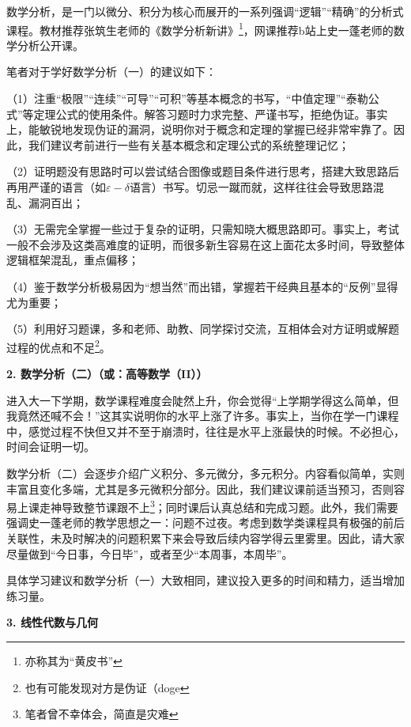 \documentclass[11pt,oneside]{book}
\begin{document}
数学分析，是一门以微分、积分为核心而展开的一系列强调“逻辑”“精确”的分析式课程。教材推荐张筑生老师的《数学分析新讲》\footnote{亦称其为“黄皮书”}，网课推荐b站上史一蓬老师的数学分析公开课。

\vspace{10pt}

笔者对于学好数学分析（一）的建议如下：

（1）注重“极限”“连续”“可导”“可积”等基本概念的书写，“中值定理”“泰勒公式”等定理公式的使用条件。解答习题时力求完整、严谨书写，拒绝伪证。事实上，能敏锐地发现伪证的漏洞，说明你对于概念和定理的掌握已经非常牢靠了。因此，我们建议考前进行一些有关基本概念和定理公式的系统整理记忆；

（2）证明题没有思路时可以尝试结合图像或题目条件进行思考，搭建大致思路后再用严谨的语言（如$\varepsilon-\delta$语言）书写。切忌一蹴而就，这样往往会导致思路混乱、漏洞百出；

（3）无需完全掌握一些过于复杂的证明，只需知晓大概思路即可。事实上，考试一般不会涉及这类高难度的证明，而很多新生容易在这上面花太多时间，导致整体逻辑框架混乱，重点偏移；

（4）鉴于数学分析极易因为“想当然”而出错，掌握若干经典且基本的“反例”显得尤为重要；

（5）利用好习题课，多和老师、助教、同学探讨交流，互相体会对方证明或解题过程的优点和不足\footnote{也有可能发现对方是伪证（doge}。

\vspace{10pt}

\textbf{2. 数学分析（二）（或：高等数学（II））}

进入大一下学期，数学课程难度会陡然上升，你会觉得“上学期学得这么简单，但我竟然还喊不会！”这其实说明你的水平上涨了许多。事实上，当你在学一门课程中，感觉过程不快但又并不至于崩溃时，往往是水平上涨最快的时候。不必担心，时间会证明一切。

数学分析（二）会逐步介绍广义积分、多元微分，多元积分。内容看似简单，实则丰富且变化多端，尤其是多元微积分部分。因此，我们建议课前适当预习，否则容易上课走神导致整节课跟不上\footnote{笔者曾不幸体会，简直是灾难}；同时课后认真总结和完成习题。此外，我们需要强调史一蓬老师的教学思想之一：问题不过夜。考虑到数学类课程具有极强的前后关联性，未及时解决的问题积累下来会导致后续内容学得云里雾里。因此，请大家尽量做到“今日事，今日毕”，或者至少“本周事，本周毕”。

具体学习建议和数学分析（一）大致相同，建议投入更多的时间和精力，适当增加练习量。

\vspace{10pt}

\textbf{3. 线性代数与几何} 
\end{document}
